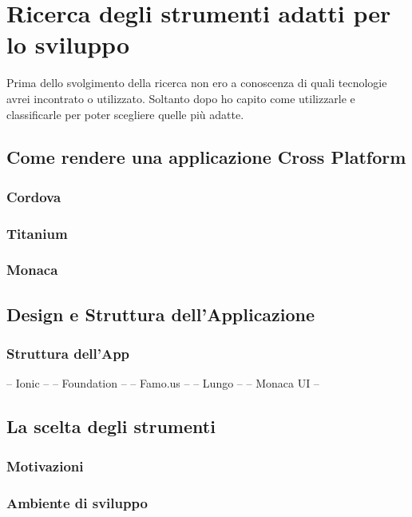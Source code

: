 \chapter{Ricerca degli strumenti adatti per lo sviluppo}
Prima dello svolgimento della ricerca non ero a conoscenza di quali tecnologie avrei incontrato o utilizzato. Soltanto dopo ho capito come utilizzarle e classificarle per poter scegliere quelle più adatte.
\section{Come rendere una applicazione Cross Platform}
\subsection{Cordova}
\subsection{Titanium}
\subsection{Monaca}
\section{Design e Struttura dell'Applicazione}
\subsection{Struttura dell'App}
-- Ionic --
-- Foundation --
-- Famo.us --
-- Lungo --
-- Monaca UI --
\section{La scelta degli strumenti}
\subsection{Motivazioni}
\subsection{Ambiente di sviluppo}

